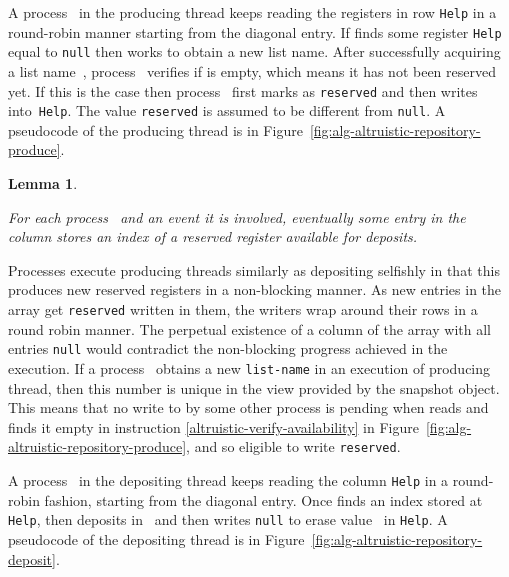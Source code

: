 \documentclass[11pt]{article}
\newcommand{\qed}{\hfill  \smallbreak}
\newenvironment{proof}{\noindent{\bf Proof:}}{\qed}
\newtheorem{lemma}{Lemma}
\begin{document}
A process~ in the producing thread keeps reading the registers in row \texttt{Help} in a round-robin manner starting from the diagonal entry. 
If  finds some register \texttt{Help} equal to \texttt{null} then  works to obtain a new list name.
After successfully acquiring a list name~, process~ verifies if  is empty, which means it has not been reserved yet.
If this is the case then process~ first marks  as \texttt{reserved} and then writes~ into~\texttt{Help}.
The value \texttt{reserved} is assumed to be different from \texttt{null}.
A pseudocode of the producing thread is in Figure~\ref{fig:alg-altruistic-repository-produce}.



\begin{lemma}
\label{lem:column-nonempty}

For each process~ and an event it is involved, eventually some entry in the column  stores an index of a reserved register available for deposits. 
\end{lemma}

\begin{proof}
Processes execute producing threads similarly as depositing selfishly in that this produces new reserved registers in a non-blocking manner.
As new entries in the array  get \texttt{reserved} written in them, the writers wrap around their rows in a round robin manner.
The perpetual existence of a column of the array  with all entries \texttt{null} would contradict the non-blocking progress achieved in the execution.
If a process~ obtains a new \texttt{list-name} in an execution of producing thread, then this number is unique in the view provided by the snapshot object. 
This means that no write to  by some other process is pending when  reads  and finds it empty in instruction \eqref{altruistic-verify-availability} in Figure~\ref{fig:alg-altruistic-repository-produce}, and so eligible to write \texttt{reserved}.
\end{proof}


A process~ in the depositing thread keeps reading the column \texttt{Help} in a round-robin fashion, starting from the diagonal entry.
Once  finds an index  stored at \texttt{Help}, then  deposits in~ and then writes \texttt{null} to erase value~ in \texttt{Help}.
A pseudocode of the depositing thread is in Figure~\ref{fig:alg-altruistic-repository-deposit}.
\end{document}
